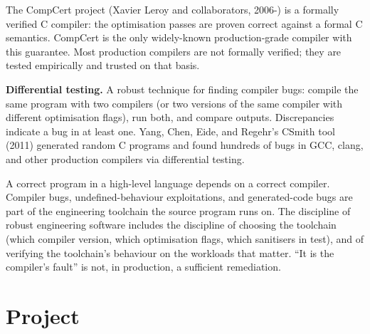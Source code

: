 The CompCert project (Xavier Leroy and collaborators, 2006-) is a formally verified C compiler: the optimisation passes are proven correct against a formal C semantics. CompCert is the only widely-known production-grade compiler with this guarantee. Most production compilers are not formally verified; they are tested empirically and trusted on that basis.

\textbf{Differential testing.} A robust technique for finding compiler bugs: compile the same program with two compilers (or two versions of the same compiler with different optimisation flags), run both, and compare outputs. Discrepancies indicate a bug in at least one. Yang, Chen, Eide, and Regehr's CSmith tool (2011) generated random C programs and found hundreds of bugs in GCC, clang, and other production compilers via differential testing.

\begin{principle}
A correct program in a high-level language depends on a correct compiler. Compiler bugs, undefined-behaviour exploitations, and generated-code bugs are part of the engineering toolchain the source program runs on. The discipline of robust engineering software includes the discipline of choosing the toolchain (which compiler version, which optimisation flags, which sanitisers in test), and of verifying the toolchain's behaviour on the workloads that matter. ``It is the compiler's fault'' is not, in production, a sufficient remediation.
\end{principle}

\section{Project}

